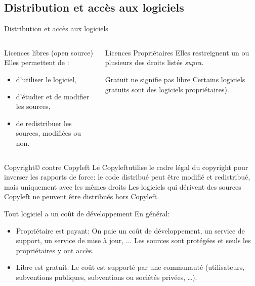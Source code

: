 \subsection{Distribution et accès aux logiciels}
\begin{frame}{Distribution et accès aux logiciels}
  \begin{columns}
    \begin{column}{6cm}
      \begin{block}{Licences libres (open source)}
        Elles permettent de :
        \begin{itemize}
        \item d'utiliser le logiciel,
        \item d'étudier et de modifier les sources,
        \item de redistribuer les sources, modifiées ou non.
        \end{itemize}
      \end{block}
    \end{column}
    \begin{column}{5cm}
      \begin{block}{Licences Propriétaires}
        Elles restreignent un ou plusieurs des droits listés \it{supra}.
      \end{block}
      \begin{block}{Gratuit ne signifie pas libre}
        Certains logiciels gratuits sont des logiciels propriétaires).
      \end{block}
    \end{column}
  \end{columns}
  \begin{block}{Copyright\copyright{} contre Copyleft\textcopyleft}
    Le Copyleft\textcopyleft utilise le cadre légal du copyright pour
    inverser les rapports de force: le code distribué peut être modifié
    et redistribué, mais uniquement avec les mêmes droits
    \textrightarrow Les logiciels qui dérivent des sources Copyleft ne
    peuvent être distribués hors Copyleft.
  \end{block}
  \begin{block}{Tout logiciel a un coût de développement}
    En général:
    \begin{itemize}
    \item Propriétaire est payant: On paie un coût de développement, un
      service de support, un service de mise à jour, ... Les sources
      sont protégées et seuls les propriétaires y ont accès.
    \item Libre est gratuit: Le coût est supporté par une communauté
      (utilisateurs, subventions publiques, subventions ou sociétés
      privées, \dots).
    \end{itemize}
  \end{block}
\end{frame}


